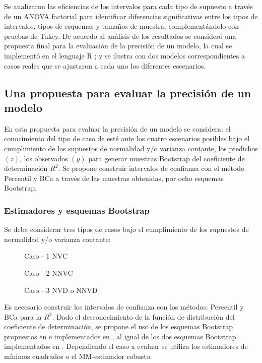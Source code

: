 Se analizaron las eficiencias de los intervalos para cada tipo de supuesto a través de un ANOVA factorial para identificar diferencias significativas entre los tipos de intervalos, tipos de esquemas y tamaños de muestra; complementándolo con pruebas de Tukey. De acuerdo al análisis de los resultados se consideró una propuesta final para la evaluación de la precisión de un modelo, la cual se implementó en el lenguaje R \parencite{R-2024}; y se ilustra con dos modelos correspondientes a casos reales que se ajustaron a cada uno los diferentes escenarios.




\subsection{Una propuesta para evaluar la precisión de un modelo}

En esta propuesta para evaluar la precisión de un modelo se considera: el conocimiento del tipo de caso de esté ante los cuatro escenarios posibles bajo el cumplimiento de los supuestos de normalidad y/o varianza contante, los predichos $(z)$, los observados $(y)$ para generar muestras Bootstrap del coeficiente de determinación $R^{2}$. Se propone construir intervalos de confianza con el método Percentil y BCa a través de las muestras obtenidas, por ocho esquemas Bootstrap. \\ 

\subsubsection{Estimadores y esquemas Bootstrap}

Se debe considerar tres tipos de casos bajo el cumplimiento de los supuestos de normalidad y/o varianza contante:

\begin{description}
	\item[] Caso - 1 NVC
	\item[] Caso - 2 NNVC
	\item[] Caso - 3 NVD o NNVD
\end{description}


Es necesario construir los intervalos de confianza con los métodos: Percentil y BCa para la $R^{2}$. Dado el desconocimiento de la función de distribución del coeficiente de determinación, se propone el uso de los esquemas Bootstrap propuestos en \textcite{rana-2012} e implementados en \textcite{zacarias-2023}, al igual de los dos esquemas Bootstrap implementados en \textcite{balam-2012}. Dependiendo el caso a evaluar se utiliza los estimadores de mínimos cuadrados o el MM-estimador robusto.\\


